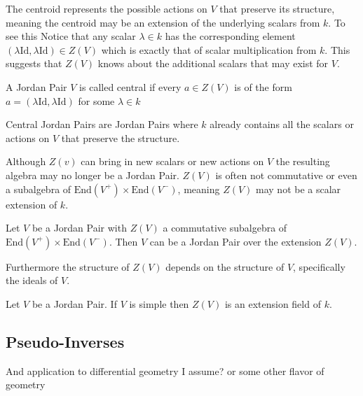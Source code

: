 The centroid represents the possible actions on $V$ that preserve its structure, 
meaning the centroid may be an extension of the underlying scalars from $k$. To see this
Notice that any scalar $\lambda\in k$ has the corresponding element $(\lambda\text{Id},\lambda\text{Id})\in Z(V)$ 
which is exactly that of scalar multiplication from $k$. This suggests that $Z(V)$ 
knows about the additional scalars that may exist for $V$.

\begin{definition}
    A Jordan Pair $V$ is called central if every $a\in Z(V)$ is of the form $a=(\lambda\text{Id},\lambda\text{Id})$ for some $\lambda\in k$
\end{definition}
Central Jordan Pairs are Jordan Pairs where $k$ already contains all the scalars or actions on $V$ that preserve the structure.


Although $Z(v)$ can bring in new scalars or new actions on $V$ the resulting algebra may no longer be a Jordan Pair. 
$Z(V)$ is often not commutative or even a subalgebra of $\text{End}(V^+)\times\text{End}(V^-)$, meaning $Z(V)$ may not be a scalar extension of $k$.

\begin{prop}
    Let $V$ be a Jordan Pair with $Z(V)$ a commutative subalgebra of 
    $\text{End}(V^+)\times\text{End}(V^-)$. Then $V$ can be a Jordan Pair over the 
    extension $Z(V)$. %
\end{prop}

Furthermore the structure of $Z(V)$ depends on the structure of $V$, specifically the ideals of $V$.


\begin{prop}
    Let $V$ be a Jordan Pair. If $V$ is simple then $Z(V)$ is an extension field of $k$.
\end{prop}

\subsection{Pseudo-Inverses} And application to differential geometry I assume? or some other flavor of geometry